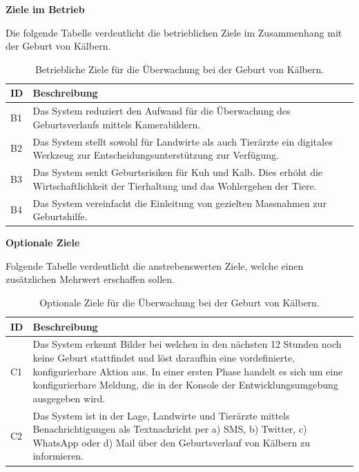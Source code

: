 \newpage

\textbf{Ziele im Betrieb}


Die folgende Tabelle verdeutlicht die betrieblichen Ziele im Zusammenhang mit der Geburt von Kälbern.

\begin{table}[H]
	
	\begin{tabular}{ p{1cm} p{14cm} }
		
		\toprule[1pt]
		\rowcolor{maroon!30}	
		ID & Beschreibung \\
		
		\midrule 
		B1 & Das System reduziert den Aufwand für die Überwachung des Geburtsverlaufs mittels Kamerabildern. \\
		B2 & Das System stellt sowohl für Landwirte als auch Tierärzte ein digitales Werkzeug zur Entscheidungsunterstützung zur Verfügung.\\
		B3 & Das System senkt Geburtsrisiken für Kuh und Kalb. Dies erhöht die Wirtschaftlichkeit der Tierhaltung und das Wohlergehen der Tiere. \\
		B4 & Das System vereinfacht die Einleitung von gezielten Massnahmen zur Geburtshilfe.\\
		\bottomrule
		
	\end{tabular}
	\caption{Betriebliche Ziele für die Überwachung bei der Geburt von Kälbern.}
	\label{tab: Betriebliche Ziele für die Überwachung bei der Geburt von Kälbern.}
\end{table}

\textbf{Optionale Ziele }

Folgende Tabelle verdeutlicht die anstrebenswerten Ziele, welche einen zusätzlichen Mehrwert erschaffen sollen.
\begin{table}[H]
	
	\begin{tabular}{ p{1cm} p{14cm}  }
		
		\toprule[1pt]
		\rowcolor{maroon!30}		
		
		ID & Beschreibung \\
		
		\midrule 
		C1 & Das System erkennt Bilder bei welchen in den nächsten 12 Stunden noch keine Geburt stattfindet und löst daraufhin eine vordefinierte, konfigurierbare Aktion aus. In einer ersten Phase handelt es sich um eine konfigurierbare Meldung, die in der Konsole der Entwicklungsumgebung ausgegeben wird.\\ 
		C2 & Das System ist in der Lage, Landwirte und Tierärzte mittels Benachrichtigungen als Textnachricht per a) SMS, b) Twitter, c) WhatsApp oder d) Mail über den Geburtsverlauf von Kälbern zu informieren.  \\
		\bottomrule
		
	\end{tabular}
	\caption{Optionale Ziele für die Überwachung bei der Geburt von Kälbern.}
	\label{tab: Optionale Ziele für die Überwachung bei der Geburt von Kälbern.}
\end{table}
